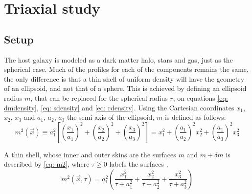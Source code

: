 
%



\chapter{Triaxial study}
	\section{Setup}	
	The host galaxy is modeled as a dark matter halo, stars and gas, just as the spherical case. Much of the profiles for each of the components remains the same, the only difference is that a thin shell of uniform density will have the geometry of an ellipsoid, and not that of a sphere. This is achieved by defining an ellipsoid radius $m$, that can be replaced for the spherical radius $r$, on equations \ref{eq: dmdensity}, \ref{eq: sdensity} and \autoref{eq: rdensity}. Using the Cartesian coordinates $x_1$, $x_2$, $x_3$ and $a_1$, $a_2$, $a_3$ the semi-axis of the ellipsoid, $m$ is defined as follows:
	\begin{equation}
		m^2(\vec{x}) \equiv a_1^2\left[\left(\dfrac{x_1}{a_1}\right)^2 + \left(\dfrac{x_2}{a_2}\right)^2 + \left(\dfrac{x_3}{a_3}\right)^2\right] = x_1^2 + \left(\dfrac{a_1}{a_2}\right)^2x_2^2 + \left(\dfrac{a_1}{a_3}\right)^2x_3^2
	\end{equation}
	
	A thin shell, whose inner and outer skins are the surfaces $m$ and $m + \delta m$ is described by \autoref{eq: m2}, where $\tau \geq 0$ labels the surfaces \cite{binney2011galactic}.
	\begin{equation}\label{eq: m2}
		m^2(\vec{x}, \tau) = a_1^2\left(\frac{x_1^{2}}{\tau + a_{1}^{2}} + \frac{x_2^{2}}{\tau + a_{2}^{2}} + \frac{x_3^{2}}{\tau + a_{3}^{2}}\right)
	\end{equation}
	
